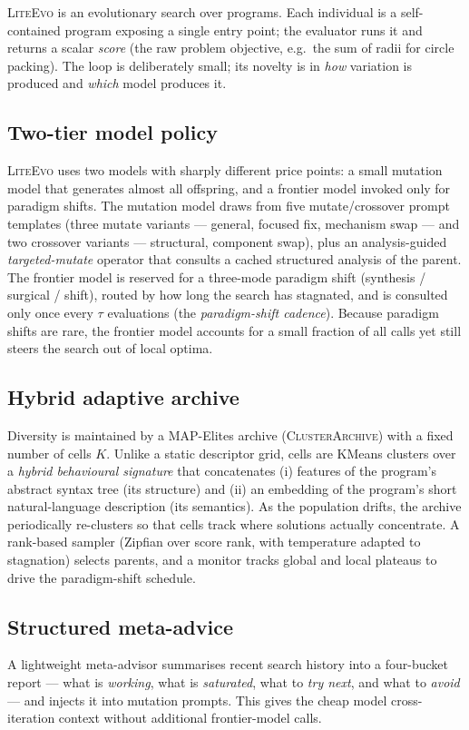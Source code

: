 \documentclass[10pt,twocolumn]{article}
\newcommand{\liteevo}{\textsc{LiteEvo}}
\begin{document}
\liteevo{} is an evolutionary search over programs. Each individual is a
self-contained program exposing a single entry point; the evaluator runs it and
returns a scalar \emph{score} (the raw problem objective, e.g.\ the sum of radii
for circle packing). The loop is deliberately small; its novelty is in
\emph{how} variation is produced and \emph{which} model produces it.

\subsection{Two-tier model policy}
\label{sec:twotier}
\liteevo{} uses two models with sharply different price points: a small
mutation model that generates almost all offspring, and a frontier model
invoked only for paradigm shifts. The mutation model draws from five
mutate/crossover prompt templates (three mutate variants --- general, focused
fix, mechanism swap --- and two crossover variants --- structural, component
swap), plus an analysis-guided \emph{targeted-mutate} operator that consults a
cached structured analysis of the parent. The frontier model is reserved for a
three-mode paradigm shift (synthesis / surgical / shift), routed by how long
the search has stagnated, and is consulted only once every $\tau$ evaluations
(the \emph{paradigm-shift cadence}). Because paradigm shifts are rare, the
frontier model accounts for a small fraction of all calls yet still steers the
search out of local optima.

\subsection{Hybrid adaptive archive}
\label{sec:archive}
Diversity is maintained by a MAP-Elites archive (\textsc{ClusterArchive}) with
a fixed number of cells $K$. Unlike a static descriptor grid, cells are
KMeans clusters over a \emph{hybrid behavioural signature} that concatenates
(i) features of the program's abstract syntax tree (its structure) and (ii) an
embedding of the program's short natural-language description (its semantics).
As the population drifts, the archive periodically re-clusters so that cells
track where solutions actually concentrate. A rank-based sampler (Zipfian over
score rank, with temperature adapted to stagnation) selects parents, and a
monitor tracks global and local plateaus to drive the paradigm-shift schedule.

\subsection{Structured meta-advice}
\label{sec:meta}
A lightweight meta-advisor summarises recent search history into a four-bucket
report --- what is \emph{working}, what is \emph{saturated}, what to \emph{try
next}, and what to \emph{avoid} --- and injects it into mutation prompts. This
gives the cheap model cross-iteration context without additional frontier-model
calls.
\end{document}
